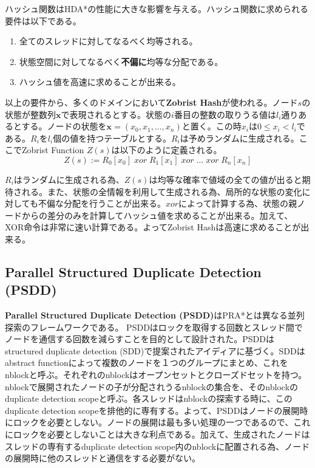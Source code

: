 \documentclass[uplatex]{jsarticle}
\begin{document}
\vspace{3mm}

ハッシュ関数はHDA*の性能に大きな影響を与える。ハッシュ関数に求められる要件は以下である。

\begin{enumerate}
	\item 全てのスレッドに対してなるべく均等される。
	\item 状態空間に対してなるべく\textbf{不偏に}均等な分配である。
	\item ハッシュ値を高速に求めることが出来る。
\end{enumerate}

以上の要件から、多くのドメインにおいて\textbf{Zobrist Hash}が使われる\cite{Zobrist1970}。ノード$s$の状態が整数列$\mathbf{x}$で表現されるとする。状態の$i$番目の整数の取りうる値は$l_{i}$通りあるとする。ノードの状態を$\mathbf{x} = (x_{0}, x_{1}, …, x_{n})$と置く。この時$x_{i}$は$0 \leq x_{i} < l_{i}$である。$R_{i}$を$l_{i}$個の値を持つテーブルとする。$R_{i}$は予めランダムに生成される。ここでZobrist Function $Z(s)$は以下のように定義される。
\newline
\begin{equation}
	Z(s) := R_{0}[x_{0}]\; xor\; R_{1}[x_{1}]\; xor\; …\; xor\; R_{n}[x_{n}]%
\end{equation}

$R_{i}$はランダムに生成される為、$Z(s)$は均等な確率で値域の全ての値が出ると期待される。また、状態の全情報を利用して生成される為、局所的な状態の変化に対しても不偏な分配を行うことが出来る。$xor$によって計算する為、状態の親ノードからの差分のみを計算してハッシュ値を求めることが出来る。加えて、XOR命令は非常に速い計算である。よってZobrist Hashは高速に求めることが出来る。


\subsection{Parallel Structured Duplicate Detection (PSDD)}
\textbf{Parallel Structured Duplicate Detection (PSDD)}はPRA*とは異なる並列探索のフレームワークである\cite{zhou2007parallel}。
PSDDはロックを取得する回数とスレッド間でノードを通信する回数を減らすことを目的として設計された。PSDDはstructured duplicate detection (SDD)で提案されたアイディアに基づく\cite{zhou2004structured}。SDDはabstract functionによって複数のノードを１つのグループにまとめ、これをnblockと呼ぶ。それぞれのnblockはオープンセットとクローズドセットを持つ。nblockで展開されたノードの子が分配されうるnblockの集合を、そのnblockのduplicate detection scopeと呼ぶ。各スレッドはnblockの探索する時に、このduplicate detection scopeを排他的に専有する。よって、PSDDはノードの展開時にロックを必要としない。ノードの展開は最も多い処理の一つであるので、これにロックを必要としないことは大きな利点である。加えて、生成されたノードはスレッドの専有するduplicate detection scope内のnblockに配置される為、ノードの展開時に他のスレッドと通信をする必要がない。
\end{document}
